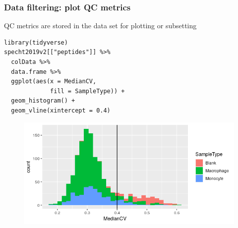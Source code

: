 \documentclass{beamer}
\newcommand{\frametitlesection}[1]{\frametitle{\centering #1 \footnotesize \hspace{0pt plus 1 filll} \insertsection}}
\begin{document}
\begin{frame}[fragile]
    \frametitlesection{Data filtering: plot QC metrics}

    QC metrics are stored in the data set for plotting or subsetting

    \begin{lstlisting}[basicstyle = \scriptsize\ttfamily\color{vdgray}]
library(tidyverse)
specht2019v2[["peptides"]] %>%
  colData %>%
  data.frame %>%
  ggplot(aes(x = MedianCV,
             fill = SampleType)) +
  geom_histogram() +
  geom_vline(xintercept = 0.4)
    \end{lstlisting}

    \begin{figure}
        \centering
        \includegraphics[width=.7\linewidth]{figs/medianCV.png}
    \end{figure}
\end{frame}
\end{document}
